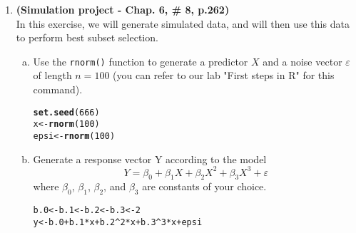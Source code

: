 \documentclass[12pt]{article}\usepackage[]{graphicx}\usepackage[]{color}
\makeatletter
\newcommand{\hlnum}[1]{\textcolor[rgb]{0.686,0.059,0.569}{#1}}%
\newcommand{\hlopt}[1]{\textcolor[rgb]{0,0,0}{#1}}%
\newcommand{\hlstd}[1]{\textcolor[rgb]{0.345,0.345,0.345}{#1}}%
\newcommand{\hlkwb}[1]{\textcolor[rgb]{0.69,0.353,0.396}{#1}}%
\newcommand{\hlkwd}[1]{\textcolor[rgb]{0.737,0.353,0.396}{\textbf{#1}}}%
\newenvironment{kframe}{%
 \def\at@end@of@kframe{}%
 \ifinner\ifhmode%
  \def\at@end@of@kframe{\end{minipage}}%
  \begin{minipage}{\columnwidth}%
 \fi\fi%
 \def\FrameCommand##1{\hskip\@totalleftmargin \hskip-\fboxsep
 \colorbox{shadecolor}{##1}\hskip-\fboxsep
     \hskip-\linewidth \hskip-\@totalleftmargin \hskip\columnwidth}%
 \MakeFramed {\advance\hsize-\width
   \@totalleftmargin\z@ \linewidth\hsize
   \@setminipage}}%
 {\par\unskip\endMakeFramed%
 \at@end@of@kframe}
\newenvironment{knitrout}{}{} %
\theoremstyle{definition}
\makeatother
\begin{document}
\begin{enumerate}[1.]
\begin{enumerate}[(a)]
    \end{enumerate}
  \item \textbf{(Simulation project - Chap. 6, \# 8, p.262)}\\
  In this exercise, we will generate simulated data, and will then use this data to perform
best subset selection.
    \begin{enumerate}[(a)]
      \item Use the \texttt{rnorm()} function to generate a predictor $X$ and a noise vector $\varepsilon$ of length
$n = 100$ (you can refer to our lab "First steps in R" for this command).
\begin{knitrout}
\color{fgcolor}\begin{kframe}
\begin{alltt}
\hlkwd{set.seed}\hlstd{(}\hlnum{666}\hlstd{)}
\hlstd{x} \hlkwb{<-} \hlkwd{rnorm}\hlstd{(}\hlnum{100}\hlstd{)}
\hlstd{epsi} \hlkwb{<-} \hlkwd{rnorm}\hlstd{(}\hlnum{100}\hlstd{)}
\end{alltt}
\end{kframe}
\end{knitrout}

      \item Generate a response vector Y according to the model
      $$Y=\beta_0 + \beta_1X + \beta_2X^2 + \beta_3X^3 + \varepsilon$$
      where $\beta_0$, $\beta_1$, $\beta_2$, and $\beta_3$ are constants of your choice.
\begin{knitrout}
\color{fgcolor}\begin{kframe}
\begin{alltt}
\hlstd{b.0} \hlkwb{<-} \hlstd{b.1} \hlkwb{<-} \hlstd{b.2} \hlkwb{<-} \hlstd{b.3} \hlkwb{<-} \hlnum{2}
\hlstd{y} \hlkwb{<-} \hlstd{b.0} \hlopt{+} \hlstd{b.1}\hlopt{*}\hlstd{x} \hlopt{+} \hlstd{b.2}\hlopt{^}\hlnum{2}\hlopt{*}\hlstd{x} \hlopt{+} \hlstd{b.3}\hlopt{^}\hlnum{3}\hlopt{*}\hlstd{x} \hlopt{+} \hlstd{epsi}
\end{alltt}
\end{kframe}
\end{knitrout}


\end{enumerate}
\end{enumerate}
\end{document}
